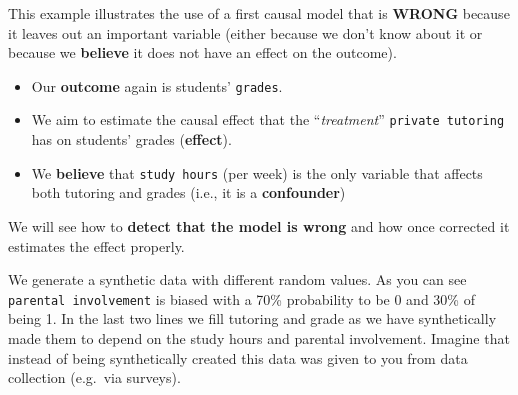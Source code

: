 \documentclass[
  12pt,
]{book}
\providecommand{\tightlist}{%
  \setlength{\itemsep}{0pt}\setlength{\parskip}{0pt}}
\begin{document}
This example illustrates the use of a first causal model that is \textbf{WRONG} because it leaves out an important variable (either because we don't know about it or because we \textbf{believe} it does not have an effect on the outcome).

\begin{itemize}
\tightlist
\item
  Our \textbf{outcome} again is students' \texttt{grades}.
\item
  We aim to estimate the causal effect that the ``\emph{treatment}'' \texttt{private\ tutoring} has on students' grades (\textbf{effect}).
\item
  We \textbf{believe} that \texttt{study\ hours} (per week) is the only variable that affects both tutoring and grades (i.e., it is a \textbf{confounder})
\end{itemize}

We will see how to \textbf{detect that the model is wrong} and how once corrected it estimates the effect properly.

We generate a synthetic data with different random values. As you can see \texttt{parental\ involvement} is biased with a 70\% probability to be 0 and 30\% of being 1. In the last two lines we fill tutoring and grade as we have synthetically made them to depend on the study hours and parental involvement. Imagine that instead of being synthetically created this data was given to you from data collection (e.g.~via surveys).
\end{document}
